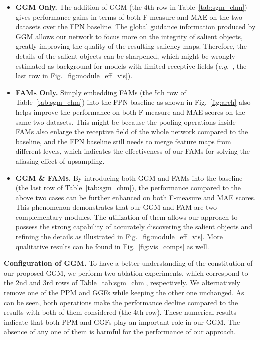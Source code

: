 \documentclass[10pt,twocolumn,letterpaper]{article}
\def\eg{\emph{e.g.~}}
\newcommand{\figref}[1]{Fig.~\ref{#1}}
\newcommand{\tabref}[1]{Table~\ref{#1}}
\newcommand{\myPara}[1]{\vspace{.05in}\noindent\textbf{#1.}}
\begin{document}
\begin{itemize}
\item
\textbf{GGM Only.} The addition of GGM (the 4th row in \tabref{tab:sgm_chm}) gives
performance gains in terms of both F-measure and MAE on the two datasets over the FPN baseline.
The global guidance information produced by GGM allows our network to focus more on
the integrity of salient objects, greatly improving the quality of
the resulting saliency maps.
Therefore, the details of the salient objects can be sharpened, which might be wrongly
estimated as background for models with limited receptive fields (\eg, the last row in \figref{fig:module_eff_vis}).
\item
\textbf{FAMs Only.} Simply embedding FAMs (the 5th row of \tabref{tab:sgm_chm}) into the FPN baseline 
as shown in \figref{fig:arch} also helps improve the performance on both F-measure and MAE scores
on the same two datasets.
This might be because the pooling operations inside FAMs also enlarge the
receptive field of the whole network compared to the baseline, and 
the FPN baseline still needs to merge feature maps from different levels,
which indicates the effectiveness of our FAMs for solving the aliasing effect of upsampling.
\item
\textbf{GGM \& FAMs.} By introducing both GGM and FAMs into the baseline 
(the last row of \tabref{tab:sgm_chm}),
the performance compared to the above two cases can be further enhanced on both
F-measure and MAE scores.
This phenomenon demonstrates that our GGM and FAM are two complementary modules.
The utilization of them allows our approach to possess the strong capability of
accurately discovering the salient objects and refining the details
as illustrated in \figref{fig:module_eff_vis}.
More qualitative results can be found in \figref{fig:vis_comps} as well.

\end{itemize}
\myPara{Configuration of GGM}
To have a better understanding of the constitution of our proposed GGM,
we perform two ablation experiments, which correspond to the 2nd and 3rd rows of \tabref{tab:sgm_chm},
respectively.
We alternatively remove one of the PPM and GGFs while keeping the other one unchanged.
As can be seen, both operations make the performance decline compared to the 
results with both of them considered (the 4th row).
These numerical results indicate that both PPM and GGFs play an important role in our GGM.
The absence of any one of them is harmful for the performance of our approach.
\end{document}
